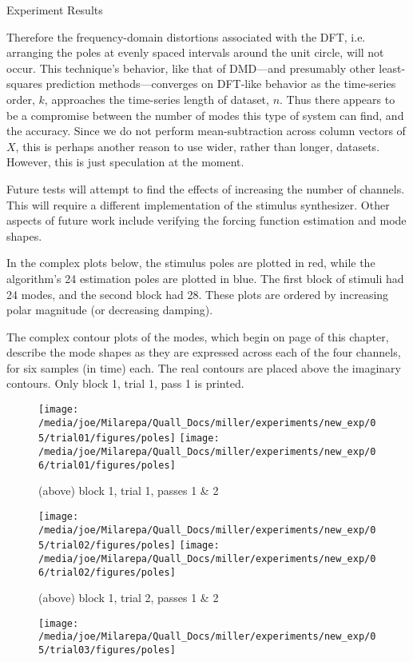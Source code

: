 \documentclass[a4paper,10pt]{report}
\numberwithin{equation}{section}
\begin{document}
{\begin{chapter}
\begin{section}{Experiment Results}
\par
Therefore the frequency-domain distortions associated with the DFT, i.e. arranging the poles at evenly spaced intervals around the unit circle, will not occur. This technique's behavior, like that of DMD---and presumably other least-squares prediction methods---converges on DFT-like behavior as the time-series order, $k$, approaches the time-series length of dataset, $n$. Thus there appears to be a compromise between the number of modes this type of system can find, and the accuracy. Since we do not perform mean-subtraction across column vectors of $X$, this is perhaps another reason to use wider, rather than longer, datasets. However, this is just speculation at the moment.
\par
Future tests will attempt to find the effects of increasing the number of channels. This will require a different implementation of the stimulus synthesizer. Other aspects of future work include verifying the forcing function estimation and mode shapes. 
\par
In the complex plots below, the stimulus poles are plotted in red, while the algorithm's 24 estimation poles are plotted in blue. The first block of stimuli had 24 modes, and the second block had 28. These plots are ordered by increasing polar magnitude (or decreasing damping).
\par
The complex contour plots of the modes, which begin on page \pageref{fig:mode_contours} of this chapter, describe the mode shapes as they are expressed across each of the four channels, for six samples (in time) each. The real contours are placed above the imaginary contours. Only block 1, trial 1, pass 1 is printed.
\begin{singlespace}
\begin{figure}[h]
\texttt{[image: /media/joe/Milarepa/Quall\_Docs/miller/experiments/new\_exp/05/trial01/figures/poles]}
\texttt{[image: /media/joe/Milarepa/Quall\_Docs/miller/experiments/new\_exp/06/trial01/figures/poles]}
\caption{(above) block 1, trial 1, passes 1 \& 2}
\texttt{[image: /media/joe/Milarepa/Quall\_Docs/miller/experiments/new\_exp/05/trial02/figures/poles]}
\texttt{[image: /media/joe/Milarepa/Quall\_Docs/miller/experiments/new\_exp/06/trial02/figures/poles]}
\caption{(above) block 1, trial 2, passes 1 \& 2}
\end{figure}
\begin{figure}[h]
\texttt{[image: /media/joe/Milarepa/Quall\_Docs/miller/experiments/new\_exp/05/trial03/figures/poles]}

\end{figure}
\end{singlespace}
\end{section}
\end{chapter}}
\end{document}
